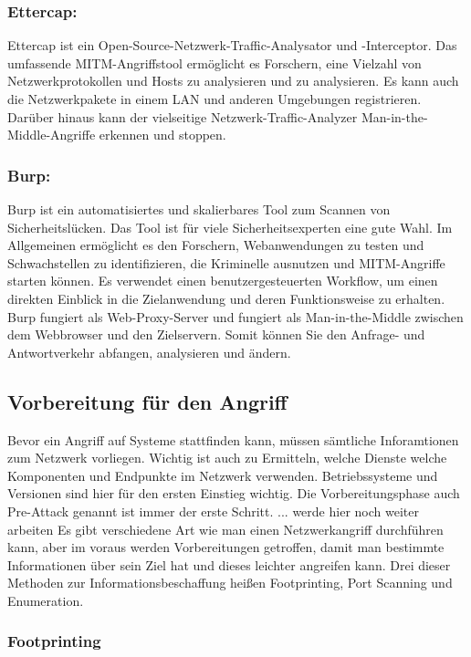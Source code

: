 \subsubsection{Ettercap:}
Ettercap ist ein Open-Source-Netzwerk-Traffic-Analysator und -Interceptor. Das umfassende MITM-Angriffstool ermöglicht es Forschern, eine Vielzahl von Netzwerkprotokollen und Hosts zu analysieren und zu analysieren. Es kann auch die Netzwerkpakete in einem LAN und anderen Umgebungen registrieren. Darüber hinaus kann der vielseitige Netzwerk-Traffic-Analyzer Man-in-the-Middle-Angriffe erkennen und stoppen.\cite{ref_url10}\par

\subsubsection{Burp:}
Burp ist ein automatisiertes und skalierbares Tool zum Scannen von Sicherheitslücken. Das Tool ist für viele Sicherheitsexperten eine gute Wahl. Im Allgemeinen ermöglicht es den Forschern, Webanwendungen zu testen und Schwachstellen zu identifizieren, die Kriminelle ausnutzen und MITM-Angriffe starten können. Es verwendet einen benutzergesteuerten Workflow, um einen direkten Einblick in die Zielanwendung und deren Funktionsweise zu erhalten. Burp fungiert als Web-Proxy-Server und fungiert als Man-in-the-Middle zwischen dem Webbrowser und den Zielservern. Somit können Sie den Anfrage- und Antwortverkehr abfangen, analysieren und ändern.\cite{ref_url10}\par

\subsection{Vorbereitung für den Angriff}
Bevor ein Angriff auf Systeme stattfinden kann, müssen sämtliche Inforamtionen zum Netzwerk vorliegen. Wichtig ist auch zu Ermitteln, welche Dienste welche Komponenten und Endpunkte im Netzwerk verwenden. Betriebssysteme und Versionen sind hier für den ersten Einstieg wichtig. Die Vorbereitungsphase auch Pre-Attack genannt ist immer der erste Schritt. 
... werde hier noch weiter arbeiten 
Es gibt verschiedene Art wie man einen Netzwerkangriff durchführen kann, aber im voraus werden Vorbereitungen getroffen, damit man bestimmte Informationen über sein Ziel hat und dieses leichter angreifen kann. Drei dieser Methoden zur Informationsbeschaffung heißen Footprinting, Port Scanning und Enumeration.

\subsubsection{Footprinting}



